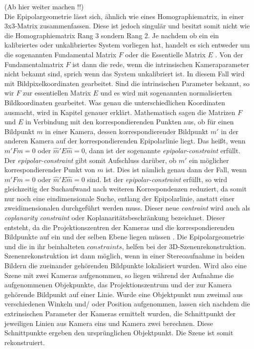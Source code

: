 (Ab hier weiter machen !!)\\
Die Epipolargeometrie lässt sich, ähnlich wie eines Homographiematrix, in einer 3x3-Matrix zusammenfassen. Diese ist jedoch singulär und besitzt somit nicht wie die Homographiematrix Rang 3 sondern Rang 2. Je nachdem ob ein ein kalibriertes oder unkalibriertes System vorliegen hat, handelt es sich entweder um die sogenannten Fundamental Matrix $F$ oder die Essentielle Matrix $E$ \cite{Elements,HZ,ZZPaper,Zhang2014,ZZGXr}. Von der Fundamentalmatrix $F$ ist dann die rede, wenn die intrinsischen Kameraparameter nicht bekannt sind, sprich wenn das System unkalibriert ist. In diesem Fall wird mit Bildpixelkoordinaten gearbeitet. Sind die intrinsischen Parameter bekannt, so wir $F$ zur essentiellen Matrix $E$ und es wird mit sogenannten normalisierten Bildkoordinaten gearbeitet\cite{ZZPaper}. Was genau die unterschiedlichen Koordinaten ausmacht, wird in Kapitel  genauer erklärt. Mathematisch sagen die Matrizen $F$ und $E$ in Verbindung mit den korrespondierenden Punkten aus, ob für einen Bildpunkt $m$ in einer Kamera, dessen korrespondierender Bildpunkt $m'$ in der anderen Kamera auf der korrespondierenden Epipolarlinie liegt.  Das heißt, wenn $m'Fm = 0$ oder $\hat{m}'E\hat{m}= 0$, dann ist der sogenannte \textit{epipolar-constraint} erfüllt. Der \textit{epipolar-constraint} gibt somit Aufschluss darüber, ob $m'$ ein möglicher korrespondierender Punkt von $m$ ist. Dies ist nämlich genau dann der Fall, wenn $m'Fm = 0$ oder $\hat{m}'E\hat{m}= 0$ sind\cite{HZ,Zhang2014}. Ist der \textit{epipolar-constraint} erfüllt, so wird gleichzeitig der Suchaufwand nach weiteren Korrespondenzen reduziert, da somit nur noch eine eindimensionale Suche, entlang der Epipolarlinie, anstatt einer zweidimensionalen durchgeführt werden muss. Dieser neue \textit{contraint} wird auch als \textit{coplanarity constraint} oder Koplanaritätsbeschränkung bezeichnet. Dieser entsteht, da die Projektionszentren der Kameras und die korrespondierenden Bildpunkte auf ein und der selben Ebene liegen müssen \cite{Zhang2014}. Die Epipolargeometrie und die in ihr beinhalteten $constraints$, helfen bei der 3D-Szenenrekonstruktion. Szenenrekonstruktion ist dann möglich, wenn in einer Stereoaufnahme in beiden Bildern die zueinander gehörenden Bildpunkte lokalisiert wurden. Wird also eine Szene mit zwei Kameras aufgenommen, so liegen während der Aufnahme die aufgenommenen Objekpunkte, das Projektionszentrum und der zur Kamera gehörende Bildpunkt auf einer Linie. Wurde eine Objektpunkt nun zweimal aus verschiedenen Winkeln und/ oder Position aufgenommen, lassen sich nachdem die extrinsischen Parameter der Kameras ermittelt wurden, die Schnittpunkt der jeweiligen Linien aus Kamera eins und Kamera zwei berechnen. Diese Schnittpunkte ergeben den ursprünglichen Objektpunkt. Die Szene ist somit rekonstruiert\cite{Elements,ZZGXr,HZ}. 



